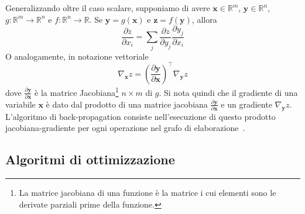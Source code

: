 \documentclass[12pt,a4paper]{report}
\begin{document}
    Generalizzando oltre il caso scalare, supponiamo di avere 
    $\boldsymbol{x}\in\mathbb{R}^m$, $\boldsymbol{y}\in\mathbb{R}^n$,
    $g:\mathbb{R}^m\rightarrow\mathbb{R}^n$ e 
    $f:\mathbb{R}^n\rightarrow\mathbb{R}$. Se $\boldsymbol{y}=
    g(\boldsymbol{x})$ e $\boldsymbol{z}=f(\boldsymbol{y})$, allora
    \begin{equation} \label{eq:chainvet}
        \frac{\partial z}{\partial x_i}=
        \sum\limits_j\frac{\partial z}{\partial y_j}
        \frac{\partial y_j}{\partial x_i}
    \end{equation}
    O analogamente, in notazione vettoriale
    \begin{equation} \label{eq:chainvetjac}
        \nabla_{\boldsymbol{x}}z=\left(
        \frac{\partial\boldsymbol{y}}{\partial\boldsymbol{x}}\right)^\intercal\nabla_{\boldsymbol{y}}z
    \end{equation}
    dove $\frac{\partial\boldsymbol{y}}{\partial\boldsymbol{x}}$ \`e
    la matrice Jacobiana\footnote{La matrice jacobiana di una funzione
    \`e la matrice i cui elementi sono le derivate parziali prime della
    funzione.} $n\times m$ di $g$. Si nota quindi che il gradiente di 
    una variabile $\boldsymbol{x}$ \`e dato dal prodotto di una matrice
    jacobiana $\frac{\partial\boldsymbol{y}}{\partial\boldsymbol{x}}$ e
    un gradiente $\nabla_{\boldsymbol{y}}z$. L'algoritmo di 
    back-propagation consiste nell'esecuzione di questo prodotto 
    jacobiana-gradiente per ogni operazione nel grafo di elaborazione~\cite{Rumelhart1986}.

    \subsection{Algoritmi di ottimizzazione}
\end{document}
